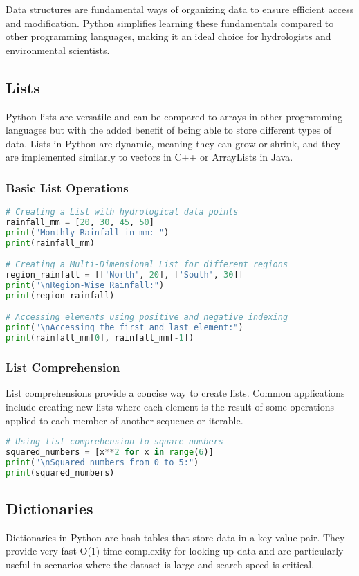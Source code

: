 Data structures are fundamental ways of organizing data to ensure efficient access and modification. Python simplifies learning these fundamentals compared to other programming languages, making it an ideal choice for hydrologists and environmental scientists.

\subsection{Lists}
Python lists are versatile and can be compared to arrays in other programming languages but with the added benefit of being able to store different types of data. Lists in Python are dynamic, meaning they can grow or shrink, and they are implemented similarly to vectors in C++ or ArrayLists in Java.

\subsubsection{Basic List Operations}
\begin{lstlisting}[language=Python]
# Creating a List with hydrological data points
rainfall_mm = [20, 30, 45, 50]
print("Monthly Rainfall in mm: ")
print(rainfall_mm)

# Creating a Multi-Dimensional List for different regions
region_rainfall = [['North', 20], ['South', 30]]
print("\nRegion-Wise Rainfall:")
print(region_rainfall) 

# Accessing elements using positive and negative indexing
print("\nAccessing the first and last element:")
print(rainfall_mm[0], rainfall_mm[-1])
\end{lstlisting}

\subsubsection{List Comprehension}
List comprehensions provide a concise way to create lists. Common applications include creating new lists where each element is the result of some operations applied to each member of another sequence or iterable.

\begin{lstlisting}[language=Python]
# Using list comprehension to square numbers
squared_numbers = [x**2 for x in range(6)]
print("\nSquared numbers from 0 to 5:")
print(squared_numbers)
\end{lstlisting}

\subsection{Dictionaries}
Dictionaries in Python are hash tables that store data in a key-value pair. They provide very fast O(1) time complexity for looking up data and are particularly useful in scenarios where the dataset is large and search speed is critical.


